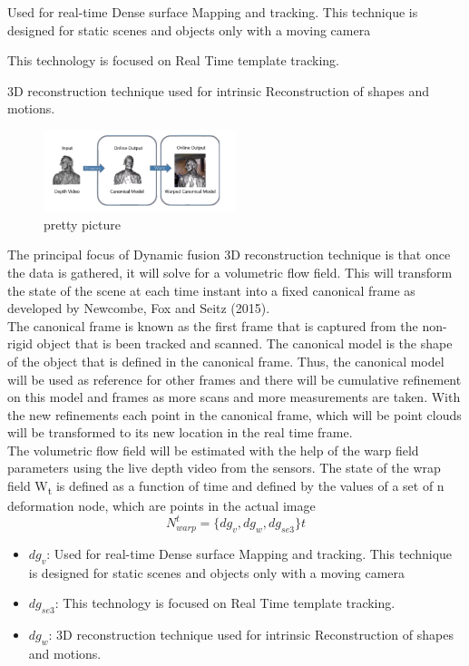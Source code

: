 \documentclass[a4paper]{article}
\begin{document}
\newpage
\begin{description}[style=nextline]
    \item[Kinect Fusion] Used for real-time Dense surface Mapping and tracking. This technique is designed for static scenes and objects only with a moving camera
    \item[DART (Dense Articulated Real Time Tracking)] This technology is focused on Real Time template tracking.
    \item[Animation Cartography] 3D reconstruction technique used for intrinsic Reconstruction of shapes and motions. 
\end{description}

\begin{figure} %
    \centering
    \includegraphics[width=0.5\textwidth]{IMG_0073.png}
    \caption{pretty picture}
\end{figure}
The principal focus of Dynamic fusion 3D reconstruction technique is that once the data is gathered, it will solve for a volumetric flow field. 
This will transform the state of the scene at each time instant into a fixed canonical frame as developed by Newcombe, Fox and Seitz (2015). \\[10pt]
The canonical frame is known as the first frame that is captured from the non-rigid object that is been tracked and scanned. The canonical model is the shape of the object that is defined in the canonical frame. 
Thus, the canonical model will be used as reference for other frames and there will be cumulative refinement on this model and frames as more scans and more measurements are taken.
With the new refinements each point in the canonical frame, which will be point clouds will be transformed to its new location in the real time frame.\\[10pt]
The volumetric flow field will be estimated with the help of the warp field parameters using the live depth video from the sensors. 
The state of the wrap field W\textsubscript{t} is defined as a function of time and defined by the values of a set of n deformation node, which are points in the actual image
\[N_{warp}^t=\{dg_v,dg_w,dg_{se3}\}t\]
\begin{itemize}[label =]
    \item $dg_{v}$: Used for real-time Dense surface Mapping and tracking. This technique is designed for static scenes and objects only with a moving camera
    \item $dg_{se3}$: This technology is focused on Real Time template tracking.
    \item $dg_{w}$: 3D reconstruction technique used for intrinsic Reconstruction of shapes and motions. 
\end{itemize}
\end{document}
